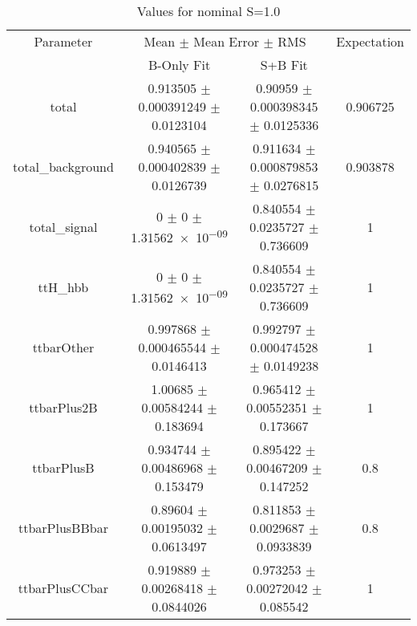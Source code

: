 \begin{table}
\centering
\caption{Values for nominal S=1.0}
\begin{tabular}{cccc}
\toprule
Parameter & \multicolumn{2}{c}{Mean $\pm$ Mean Error $\pm$ RMS} & Expectation\\
 & B-Only Fit & S+B Fit & \\
\midrule
total & \num{0.913505} $\pm$ \num{0.000391249} $\pm$ \num{0.0123104} & \num{0.90959} $\pm$ \num{0.000398345} $\pm$ \num{0.0125336} & \num{0.906725}\\
total\_background & \num{0.940565} $\pm$ \num{0.000402839} $\pm$ \num{0.0126739} & \num{0.911634} $\pm$ \num{0.000879853} $\pm$ \num{0.0276815} & \num{0.903878}\\
total\_signal & \num{0} $\pm$ \num{0} $\pm$ \num{1.31562e-09} & \num{0.840554} $\pm$ \num{0.0235727} $\pm$ \num{0.736609} & \num{1}\\
ttH\_hbb & \num{0} $\pm$ \num{0} $\pm$ \num{1.31562e-09} & \num{0.840554} $\pm$ \num{0.0235727} $\pm$ \num{0.736609} & \num{1}\\
ttbarOther & \num{0.997868} $\pm$ \num{0.000465544} $\pm$ \num{0.0146413} & \num{0.992797} $\pm$ \num{0.000474528} $\pm$ \num{0.0149238} & \num{1}\\
ttbarPlus2B & \num{1.00685} $\pm$ \num{0.00584244} $\pm$ \num{0.183694} & \num{0.965412} $\pm$ \num{0.00552351} $\pm$ \num{0.173667} & \num{1}\\
ttbarPlusB & \num{0.934744} $\pm$ \num{0.00486968} $\pm$ \num{0.153479} & \num{0.895422} $\pm$ \num{0.00467209} $\pm$ \num{0.147252} & \num{0.8}\\
ttbarPlusBBbar & \num{0.89604} $\pm$ \num{0.00195032} $\pm$ \num{0.0613497} & \num{0.811853} $\pm$ \num{0.0029687} $\pm$ \num{0.0933839} & \num{0.8}\\
ttbarPlusCCbar & \num{0.919889} $\pm$ \num{0.00268418} $\pm$ \num{0.0844026} & \num{0.973253} $\pm$ \num{0.00272042} $\pm$ \num{0.085542} & \num{1}\\
\bottomrule
\end{tabular}
\end{table}